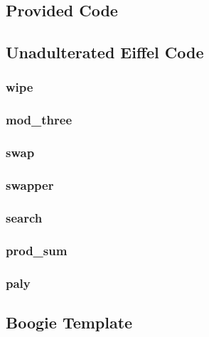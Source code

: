 \begin{appendices}
\section{Provided Code}\label{appendix_code}
\subsection{Unadulterated Eiffel Code}\label{eiffel_code}

\subsubsection{wipe}\label{eiffel_code_wipe}

\pagebreak
\subsubsection{mod\_three}\label{eiffel_code_mod_three}

\pagebreak
\subsubsection{swap}\label{eiffel_code_swap}

\pagebreak
\subsubsection{swapper}\label{eiffel_code_swapper}

\pagebreak
\subsubsection{search}\label{eiffel_code_search}

\pagebreak
\subsubsection{prod\_sum}\label{eiffel_code_prod_sum}

\pagebreak
\subsubsection{paly}\label{eiffel_code_paly}

\pagebreak

\subsection{Boogie Template}

\end{appendices}